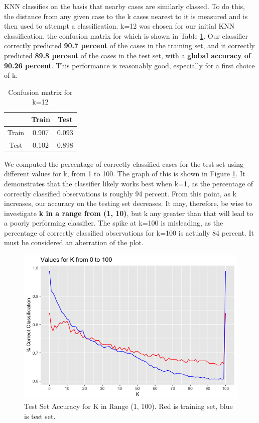 \documentclass{homework}
\begin{document}
\question
KNN classifies on the basis that nearby cases are similarly classed. To do this, the distance from any given case to the k cases nearest to it is measured and is then used to attempt a classification. k=12 was chosen for our initial KNN classification, the confusion matrix for which is shown in Table \ref{tab:Table 2}. Our classifier correctly predicted \textbf{90.7 percent} of the cases in the training set, and it correctly predicted \textbf{89.8 percent} of the cases in the test set, with a \textbf{global accuracy of 90.26 percent}. This performance is reasonably good, especially for a first choice of k.
\begin{table}[h]
    \centering
    \begin{tabular}{c|cc}
         &Train&Test \\\hline
         Train&0.907&0.093 \\
         Test&0.102&0.898
    \end{tabular}
    \caption{Confusion matrix for k=12}
    \label{tab:Table 2}
\end{table}
\question
We computed the percentage of correctly classified cases for the test set using different values for k, from 1 to 100. The graph of this is shown in Figure \ref{fig:Figure 1}. It demonstrates that the classifier likely works best when k=1, as the percentage of correctly classified observations is roughly 94 percent. From this point, as k increases, our accuracy on the testing set decreases. It may, therefore, be wise to investigate \textbf{k in a range from (1, 10)}, but k any greater than that will lead to a poorly performing classifier. The spike at k=100 is misleading, as the percentage of correctly classified observations for k=100 is actually 84 percent. It must be considered an aberration of the plot.

\begin{figure}[h]
    \centering
    \includegraphics[width=13cm]{graphs/Krange.png}
    \caption{Test Set Accuracy for K in Range (1, 100). Red is training set, blue is test set.}
    \label{fig:Figure 1}
\end{figure}
\end{document}
